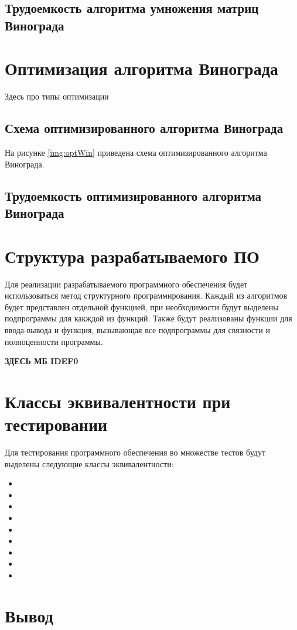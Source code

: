 \subsection{Трудоемкость алгоритма умножения матриц Винограда}

\section{Оптимизация алгоритма Винограда}

Здесь про типы оптимизации

\subsection{Схема оптимизированного алгоритма Винограда}

На рисунке \ref{img:optWin} приведена схема оптимизированного алгоритма Винограда.

\subsection{Трудоемкость оптимизированного алгоритма Винограда}

\section{Структура разрабатываемого ПО}

Для реализации разрабатываемого программного обеспечения будет использоваться
метод структурного программирования. Каждый из алгоритмов будет представлен
отдельной функцией, при необходимости будут выделены подпрограммы для какждой
из функций. Также будут реализованы функции для ввода-вывода
и функция, вызывающая все подпрограммы для связности и полноценности
программы.

\textbf{ЗДЕСЬ МБ IDEF0}

\section{Классы эквивалентности при тестировании}

Для тестирования программного обеспечения во множестве тестов будут выделены
следующие классы эквивалентности:
\begin{itemize}[left=\parindent]
    \item
    \item
    \item
    \item
    \item
    \item
    \item
    \item
    \item
\end{itemize}

\section{Вывод}


